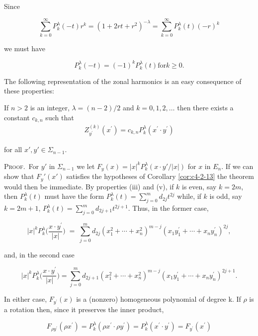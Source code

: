 Since

\[
\sum_{k=0}^{\infty}P_{k}^{\lambda}(-t)r^{k}=(1+2rt+r^{2})^{-\lambda}=\sum_{k=0}^{\infty}P_{k}^{\lambda}(t)(-r)^{k}
\]

we must have

\begin{equation}
\tag{v}
P_{k}^{\lambda}(-t)=(-1)^{k}P_{k}^{\lambda}(t)\text{for}k\geq0.
\end{equation}

The following representation of the zonal harmonics is an easy consequence of these properties:

\begin{theorem}
\label{thm:c4-2-14}
If $n > 2$ is an integer, $\lambda = (n - 2)/2$ and $k = 0, 1, 2, \ldots$ then there exists a constant $c_{k,n}$ such that
\[
\begin{array}{r}{Z_{y^{\prime}}^{(k)}(x^{\prime})=c_{k,n}P_{k}^{\lambda}(x^{\prime}{\cdot}y^{\prime})}\end{array}
\]

for all $x', y' \in \Sigma_{n-1}$.
\end{theorem}

\textsc{Proof.}\ For $y'$ in $\Sigma_{n-1}$ we let $F_y(x) = |x|^{k}P_k^\lambda(x \cdot y'/|x|)$ for $x$ in $E_n$. If we can show that $F_y'(x')$ satisfies the hypotheses of Corollary \ref{cor:c4-2-13} the theorem would then be immediate. By properties (iii) and (v), if $k$ is even, say $k = 2m$, then $P_k^\lambda(t)$ must have the form $P_k^\lambda(t) = \sum_{j=0}^{m} d_{2j} t^{2j}$ while, if $k$ is odd, say $k = 2m + 1$, $P_k^\lambda(t) = \sum_{j=0}^{m} d_{2j+1} t^{2j+1}$. Thus, in the former case,

\[
|x|^{k}P_{k}^{\lambda}\biggl(\frac{x\cdot y^{\prime}}{|x|}\biggr)\;=\;\sum_{j=0}^{m}d_{2j}(x_{1}^{2}+\cdots+x_{n}^{2})^{m-j}(x_{1}y_{1}^{\prime}+\cdots+x_{n}y_{n}^{\prime})^{2j},
\]

and, in the second case

\[
|x|^{k}P_{k}^{\lambda}\biggl(\frac{x\cdot y^{\prime}}{|x|}\biggr)=\sum_{j=0}^{m}d_{2j+1}(x_{1}^{2}+\cdots+x_{n}^{2})^{m-j}(x_{1}y_{1}^{\prime}+\cdots+x_{n}y_{n}^{\prime})^{2j+1}.
\]

In either case, $F_{y^{\prime}}(x)$ is a (nonzero) homogeneous polynomial of degree k. If $\rho$ is a rotation then, since it preserves the inner product,

\[
F_{\rho y^{\prime}}(\rho x^{\prime})=P_{k}^{\lambda}(\rho x^{\prime}\cdot\rho y^{\prime})=P_{k}^{\lambda}(x^{\prime}\cdot y^{\prime})=F_{y^{\prime}}(x^{\prime})
\]

